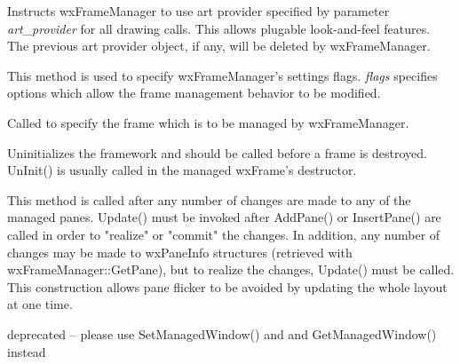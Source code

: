 Instructs wxFrameManager to use art provider specified by parameter
{\it art_provider} for all drawing calls. This allows plugable
look-and-feel features. The previous art provider object, if any,
will be deleted by wxFrameManager.

\label{wxframemanagersetflags}


This method is used to specify wxFrameManager's settings flags. {\it flags}
specifies options which allow the frame management behavior to be modified.

\label{wxframemanagersetmanagedwindow}


Called to specify the frame which is to be managed by wxFrameManager.

\label{wxframemanagershowhint}



\label{wxframemanageruninit}


Uninitializes the framework and should be called before a frame is
destroyed. UnInit() is usually called in the managed wxFrame's destructor.

\label{wxframemanagerupdate}


This method is called after any number of changes are
made to any of the managed panes. Update() must be invoked after
AddPane() or InsertPane() are called in order to "realize" or "commit"
the changes. In addition, any number of changes may be made to
wxPaneInfo structures (retrieved with wxFrameManager::GetPane), but to
realize the changes, Update() must be called. This construction allows
pane flicker to be avoided by updating the whole layout at one time.

\label{wxframemanagerupdatebuttononscreen}



\label{wxframemanagerwxdeprecated}


deprecated -- please use SetManagedWindow() and
and GetManagedWindow() instead



